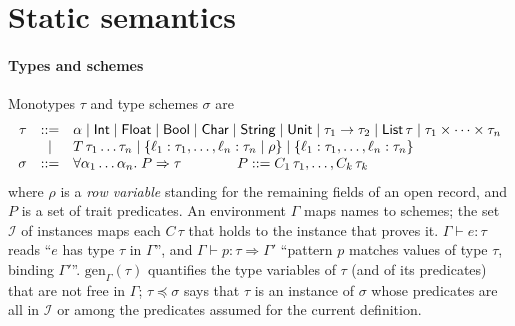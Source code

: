 \section{Static semantics}
\label{sec:static-semantics}

\paragraph{Types and schemes} Monotypes $\tau$ and type schemes $\sigma$ are
\[
\begin{array}{rcl}
\tau & ::= & \alpha \mid \mathsf{Int} \mid \mathsf{Float} \mid \mathsf{Bool} \mid \mathsf{Char} \mid \mathsf{String} \mid \mathsf{Unit}
  \mid \tau_1 \to \tau_2 \mid \mathsf{List}\,\tau \mid \tau_1 \times\dots\times \tau_n \\
 & \mid & T\,\tau_1\dots\tau_n \mid \{\ell_1:\tau_1,\dots,\ell_n:\tau_n \mid \rho\} \mid \{\ell_1:\tau_1,\dots,\ell_n:\tau_n\} \\
\sigma & ::= & \forall \alpha_1\dots\alpha_n.\; P \Rightarrow \tau \qquad\qquad P ::= C_1\,\tau_1, \dots, C_k\,\tau_k
\end{array}
\]
where $\rho$ is a \emph{row variable} standing for the remaining fields of
an open record, and $P$ is a set of trait predicates. An environment
$\Gamma$ maps names to schemes; the set $\mathcal{I}$ of instances maps
each $C\,\tau$ that holds to the instance that proves it. $\Gamma \vdash e :
\tau$ reads ``$e$ has type $\tau$ in $\Gamma$'', and
$\Gamma \vdash p : \tau \Rightarrow \Gamma'$ ``pattern $p$ matches values of
type $\tau$, binding $\Gamma'$''. $\mathrm{gen}_\Gamma(\tau)$ quantifies
the type variables of $\tau$ (and of its predicates) that are not free in
$\Gamma$; $\tau \preceq \sigma$ says that $\tau$ is an instance of $\sigma$
whose predicates are all in $\mathcal{I}$ or among the predicates assumed
for the current definition.

